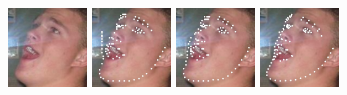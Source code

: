\documentclass[journal,transmag]{IEEEtran}
\begin{document}
\begin{figure}[tbh]

   
   
   \includegraphics[width=2.1cm]{visualization_imgs/raw_images/WFLW_test_434.jpg}
   \includegraphics[width=2.1cm]{visualization_imgs/hrnet_pred_images/pred_434.jpg}
   \includegraphics[width=2.1cm]{visualization_imgs/ATF_pred_images/pred_434.jpg}
   \includegraphics[width=2.1cm]{visualization_imgs/gt_images/WFLW_test_434.jpg}


\end{figure}
\end{document}
